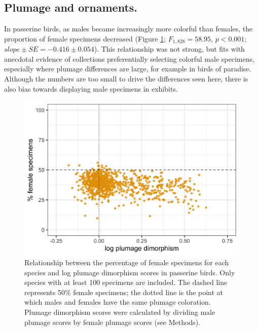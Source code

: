 \documentclass[a4paper, 12pt]{article}
\begin{document}
\subsection{Plumage and ornaments.} 
In passerine birds, as males became increasingly more colorful than females, the proportion of female specimens decreased (Figure \ref{fig-plumage}; $F_{1, 828} = 58.95$, $p < 0.001$; $slope \pm SE = -0.416 \pm 0.054$). 
This relationship was not strong, but fits with anecdotal evidence of collections preferentially selecting colorful male specimens, especially where plumage differences are large, for example in birds of paradise. 
Although the numbers are too small to drive the differences seen here, there is also bias towards displaying male specimens in exhibits\cite{machin2008}.

\begin{figure}
 \centering
  \includegraphics[width = \linewidth]{figures/plumage.png}
  \caption{Relationship between the percentage of female specimens for each species and log plumage dimorphism scores in passerine birds. 
  Only species with at least 100 specimens are included. 
  The dashed line represents 50\% female specimens; the dotted line is the point at which males and females have the same plumage coloration. 
  Plumage dimorphism scores were calculated by dividing male plumage scores by female plumage scores (see Methods). 
}
  \label{fig-plumage}
\end{figure}
\end{document}
